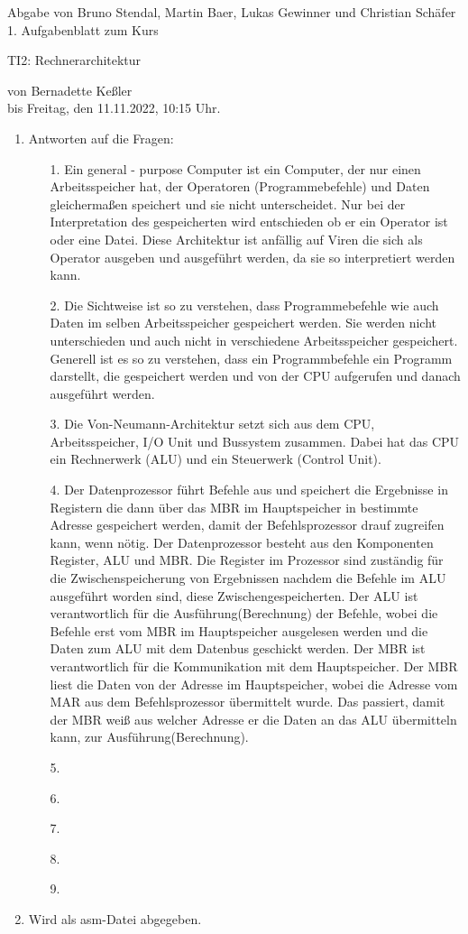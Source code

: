 \documentclass[11pt]{article}
\newcommand{\VORLESUNG}{TI2: Rechnerarchitektur}
\newcommand{\STUDENTS}{Bruno Stendal, Martin Baer, Lukas Gewinner und Christian Schäfer}
\newcommand{\STAFF}{Bernadette Keßler}
\newcommand{\ASSIGNMENT}{1}
\newcommand{\DELIVER}{Freitag, den 11.11.2022, 10:15 Uhr}
\newcommand{\aufgabe}[1]{\item{\bf #1}}
\begin{document}
\ofoot{\pagemark}
\begin{center}
    Abgabe von \STUDENTS{}\\
 \ASSIGNMENT{}. Aufgabenblatt  zum Kurs 
\vspace*{0.2cm}

{\Large \VORLESUNG{}}

{\small von \STAFF{} \\ bis \DELIVER{}.}
\vspace*{0.5cm}\\
\end{center}
\begin{enumerate}
\setcounter{enumi}{0}
\aufgabe{}Antworten auf die Fragen:
\begin{enumerate}
\item[1.] Ein general - purpose Computer ist ein Computer, der nur einen Arbeitsspeicher hat, der Operatoren (Programmebefehle) und Daten gleichermaßen speichert und sie nicht unterscheidet. Nur bei der Interpretation des gespeicherten wird entschieden ob er ein Operator ist oder eine Datei. Diese Architektur ist anfällig auf Viren die sich als Operator ausgeben und ausgeführt werden, da sie so interpretiert werden kann.
\item[2.] Die Sichtweise ist so zu verstehen, dass Programmebefehle wie auch Daten im selben Arbeitsspeicher gespeichert werden. Sie werden nicht unterschieden und auch nicht in verschiedene Arbeitsspeicher gespeichert. Generell ist es so zu verstehen, dass ein Programmbefehle ein Programm darstellt, die gespeichert werden und von der CPU aufgerufen und danach ausgeführt werden.
\item[3.] Die Von-Neumann-Architektur setzt sich aus dem CPU, Arbeitsspeicher, I/O Unit und Bussystem zusammen. Dabei hat das CPU ein Rechnerwerk (ALU) und ein Steuerwerk (Control Unit).
\item[4.] Der Datenprozessor führt Befehle aus und speichert die Ergebnisse in Registern die dann über das MBR im Hauptspeicher in bestimmte Adresse gespeichert werden, damit der Befehlsprozessor drauf zugreifen kann, wenn nötig. Der Datenprozessor besteht aus den Komponenten  Register, ALU und MBR. Die Register im Prozessor sind zuständig für die Zwischenspeicherung von Ergebnissen nachdem die Befehle im ALU ausgeführt worden sind, diese Zwischengespeicherten. Der ALU ist verantwortlich für die Ausführung(Berechnung) der Befehle, wobei die Befehle erst vom MBR im Hauptspeicher ausgelesen werden und die Daten zum ALU mit dem Datenbus geschickt werden. Der MBR ist verantwortlich für die Kommunikation mit dem Hauptspeicher. Der MBR liest die Daten von der Adresse im Hauptspeicher, wobei die Adresse vom MAR aus dem Befehlsprozessor übermittelt wurde. Das passiert, damit der MBR weiß aus welcher Adresse er die Daten an das ALU übermitteln kann, zur Ausführung(Berechnung).
\item[5.]
\item[6.]
\item[7.]
\item[8.]
\item[9.]
\end{enumerate}
\aufgabe{} Wird als asm-Datei abgegeben.  
\end{enumerate}
\end{document}
